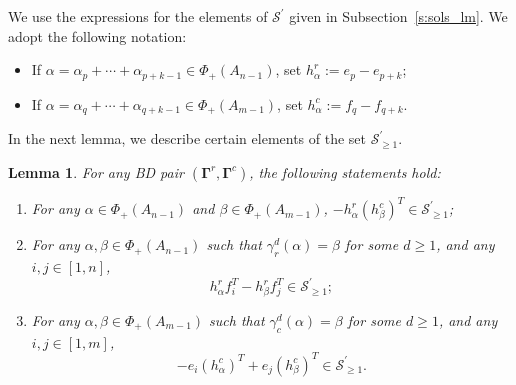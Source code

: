 \documentclass[11pt]{article}
\newcommand{\bg}{\mathbf{\Gamma}}
\newtheorem{lemma}[theorem]{Lemma}%
\theoremstyle{definition}\newtheorem{definition}[theorem]{Definition}
\theoremstyle{definition}\newtheorem{remark}[theorem]{Remark}
\theoremstyle{remark}
\numberwithin{equation}{section}
\begin{document}
We use the expressions for the elements of $\mathcal{S}^\prime$ given in Subsection~\ref{s:sols_lm}. We adopt the following notation:
\begin{itemize}
    \item If $\alpha = \alpha_p + \cdots + \alpha_{p+k-1} \in \Phi_+(A_{n-1})$, set $h_{\alpha}^r := e_p - e_{p+k}$;
    \item If $\alpha = \alpha_q + \cdots + \alpha_{q+k-1} \in \Phi_+(A_{m-1})$, set $h_{\alpha}^c := f_q - f_{q+k}$.
\end{itemize}
In the next lemma, we describe certain elements of the set $\mathcal{S}^\prime_{\geq 1}$.

\begin{lemma}\label{l:sp_w}
    For any BD pair $(\bg^r,\bg^c)$, the following statements hold:
    \begin{enumerate}[1)]
        \item For any $\alpha \in \Phi_+(A_{n-1})$ and $\beta \in \Phi_+(A_{m-1})$, $-h_{\alpha}^r(h_{\beta}^c)^T \in \mathcal{S}^\prime_{\geq 1}$;
        \item For any $\alpha,\beta \in \Phi_+(A_{n-1})$ such that $\gamma_r^d(\alpha) = \beta$ for some $d \geq 1$, and any $i,j \in [1,n]$, \begin{equation*}
            h_{\alpha}^r f_i^T - h_{\beta}^r f_{j}^T \in \mathcal{S}^\prime_{\geq 1};
        \end{equation*}
        \item For any $\alpha,\beta \in \Phi_+(A_{m-1})$ such that $\gamma_c^d(\alpha) = \beta$ for some $d \geq 1$, and any $i,j \in [1,m]$,
        \begin{equation*}
            -e_{i} (h_{\alpha}^c)^T + e_j (h_{\beta}^c)^T \in\mathcal{S}^\prime_{\geq 1}.
        \end{equation*}
    \end{enumerate}
\end{lemma}
\end{document}

